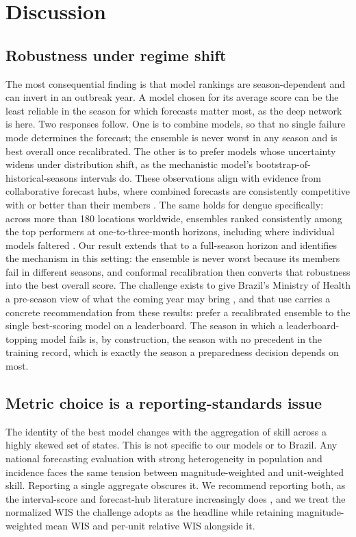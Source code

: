 \documentclass[11pt]{article}
\begin{document}
\section{Discussion}

\subsection{Robustness under regime shift}
The most consequential finding is that model rankings are season-dependent and can invert in an
outbreak year. A model chosen for its average score can be the least reliable in the season for which
forecasts matter most, as the deep network is here. Two responses follow. One is to combine models,
so that no single failure mode determines the forecast; the ensemble is never worst in any season
and is best overall once recalibrated. The other is to prefer models whose uncertainty widens under
distribution shift, as the mechanistic model's bootstrap-of-historical-seasons intervals do. These
observations align with evidence from collaborative forecast hubs, where combined forecasts are
consistently competitive with or better than their members \citep{cramer2022,reich2019,sherratt2023}.
The same holds for dengue specifically: across more than 180 locations worldwide, ensembles
ranked consistently among the top performers at one-to-three-month horizons, including where
individual models faltered \citep{wu2025}. Our result extends that to a full-season horizon and
identifies the mechanism in this setting: the ensemble is never worst because its members fail in
different seasons, and conformal recalibration then converts that robustness into the best overall
score. The challenge exists to give Brazil's Ministry of Health a pre-season view of what the
coming year may bring \citep{araujo2026}, and that use carries a concrete recommendation from these
results: prefer a recalibrated ensemble to the single best-scoring model on a leaderboard. The
season in which a leaderboard-topping model fails is, by construction, the season with no
precedent in the training record, which is exactly the season a preparedness decision depends on
most.

\subsection{Metric choice is a reporting-standards issue}
The identity of the best model changes with the aggregation of skill across a highly skewed set of
states. This is not specific to our models or to Brazil. Any national forecasting evaluation with
strong heterogeneity in population and incidence faces the same tension between magnitude-weighted
and unit-weighted skill. Reporting a single aggregate obscures it. We recommend reporting both, as
the interval-score and forecast-hub literature increasingly does \citep{bracher2021}, and we treat
the normalized WIS the challenge adopts as the headline while retaining magnitude-weighted mean WIS
and per-unit relative WIS alongside it.
\end{document}
